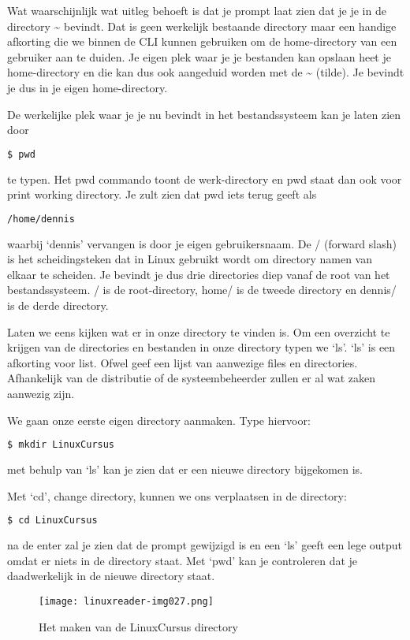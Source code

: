 Wat waarschijnlijk wat uitleg behoeft is dat je prompt laat zien dat je je in de directory \~{} bevindt. Dat is geen werkelijk bestaande directory maar een handige afkorting die we binnen de CLI kunnen gebruiken om de home-directory van een gebruiker aan te duiden. Je eigen plek waar je je bestanden kan opslaan heet je home-directory en die kan dus ook aangeduid worden met de \~{} (tilde). Je bevindt je dus in je eigen home-directory.

De werkelijke plek waar je je nu bevindt in het bestandssysteem kan je laten zien door
\begin{lstlisting}[language=bash]
$ pwd
\end{lstlisting}
te typen. Het pwd commando toont de werk-directory en pwd staat dan ook voor print working directory. Je zult zien dat
pwd iets terug geeft als
\begin{lstlisting}[language=bash]
/home/dennis
\end{lstlisting}
waarbij `dennis' vervangen is door je eigen gebruikersnaam. De / (forward slash) is het scheidingsteken dat in Linux gebruikt wordt om directory namen van elkaar te scheiden. Je bevindt je dus drie directories diep vanaf de root van het bestandssysteem. / is de root-directory, home/ is de tweede directory en dennis/ is de derde directory.

Laten we eens kijken wat er in onze directory te vinden is. Om een overzicht te krijgen van de directories en bestanden in onze directory typen we `ls'. `ls' is een afkorting voor list. Ofwel geef een lijst van aanwezige files en directories. Afhankelijk van de distributie of de systeembeheerder zullen er al wat zaken aanwezig zijn.

We gaan onze eerste eigen directory aanmaken. Type hiervoor:
\begin{lstlisting}[language=bash]
$ mkdir LinuxCursus
\end{lstlisting}
met behulp van `ls' kan je zien dat er een nieuwe directory bijgekomen is.

Met `cd', change directory, kunnen we ons verplaatsen in de directory:
\begin{lstlisting}[language=bash]
$ cd LinuxCursus
\end{lstlisting}
na de enter zal je zien dat de prompt gewijzigd is en een `ls' geeft een lege output omdat er niets in de directory staat. Met `pwd' kan je controleren dat je daadwerkelijk in de nieuwe directory staat.

\begin{figure}
\texttt{[image: linuxreader-img027.png]}
	\label{fig:CreateDirLinuxCursus}
	\caption{Het maken van de LinuxCursus directory}
\end{figure}

